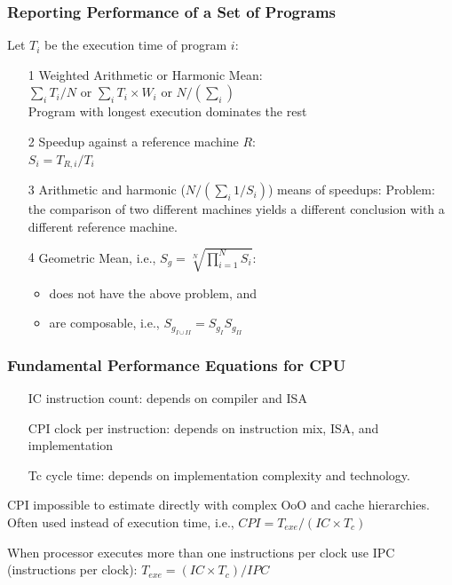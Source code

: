 \documentclass{beamer}
\renewcommand{\emph}[1]{\textcolor{structure}{#1}}
\newcommand{\emp}[1]{\textcolor{DikuRed}{ #1}}
\begin{document}
\begin{frame}[fragile,t]
\frametitle{Reporting Performance of a Set of Programs}

Let $T_i$ be the execution time of program $i$:
\begin{itemize}
    \item[1] Weighted Arithmetic or Harmonic Mean:\\
            $\sum_i T_i/N$ or $\sum_i T_i \times W_i$ or $N / (\sum_i )$\\
            \alert{Program with longest execution dominates the rest}\medskip

    \item[2] Speedup against a reference machine $R$:\\
                $S_i = T_{R,i} / T_i$\medskip

    \item[3] Arithmetic and harmonic ($N/(\sum_i 1/S_i)$) means of speedups: 
                \alert{Problem: the comparison
                of two different machines yields a different conclusion
                with a different reference machine.}\medskip
    \item[4] \emph{Geometric Mean, i.e., $S_g = \sqrt[N]{\prod_{i=1}^N S_i}$:}
                \begin{itemize}
                    \item does not have the above problem, and
                    \item are composable, i.e., $S_{g_{I\cup II}} = S_{g_I} S_{g_{II}}$
                \end  {itemize}
\end{itemize}

\end{frame}

\begin{frame}[fragile,t]
\frametitle{Fundamental Performance Equations for CPU}

\begin{itemize}
    \item[IC] instruction count: depends on compiler and ISA
    \item[CPI] clock per instruction: depends on 
                instruction mix, ISA, and implementation
    \item[Tc] cycle time: depends on implementation complexity and technology.
\end{itemize}\bigskip

\emp{CPI impossible to estimate directly with complex OoO and cache hierarchies.}
\emph{Often used instead of execution time}, i.e., $CPI = T_{exe} / (IC \times T_c)$
\bigskip


When processor executes more than one instructions per clock
use IPC (instructions per clock): $T_{exe} = (IC \times T_c) / IPC$

\end{frame}
\end{document}
